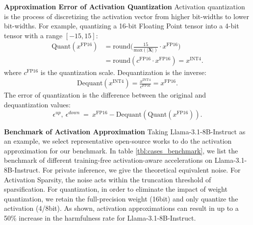 \textbf{Approximation Error of Activation Quantization} Activation quantization is the process of discretizing the activation vector from higher bit-widths to lower bit-widths. For example, quantizing a 16-bit Floating Point tensor into a 4-bit tensor with a range $[-15, 15]$:
\begin{align*}
    \text{Quant}(x^\text{FP16})
    &=\text{round}\Big(\frac{15}{\text{max}(|\mathbf{X}|)}\cdot x^\text{FP16} \Big) \\
    &=\text{round}(c^\text{FP16}\cdot x^\text{FP16}) = x^\text{INT4}.
\end{align*}
where $c^\text{FP16}$ is the quantization scale. Dequantization is the inverse:
\begin{align*}
    \text{Dequant}(x^\text{INT4}) = \frac{x^\text{INT4}}{c^\text{FP16}} = x^\text{FP16}.
\end{align*}
The error of quantization is the difference between the original and dequantization values:
\begin{equation*}
    \label{equation:quantization}
    \epsilon^{up},~\epsilon^{down} ~=~ x^\text{FP16} - \text{Dequant}(\text{Quant}(x^\text{FP16})). 
\end{equation*}

\textbf{Benchmark of Activation Approximation} Taking Llama-3.1-8B-Instruct as an example, we select representative open-source works to do the activation approximation for our benchmark. In table \ref{tbl:cases_benchmark}, we list the benchmark of different training-free activation-aware accelerations on Llama-3.1-8B-Instruct. For private inference, we give the theoretical equivalent noise. For Activation Sparsity, the noise acts within the truncation threshold of sparsification. For quantization, in order to eliminate the impact of weight quantization, we retain the full-precision weight (16bit) and only quantize the activation (4/8bit). As shown, activation approximations can result in up to a 50\% increase in the harmfulness rate for Llama-3.1-8B-Instruct.

